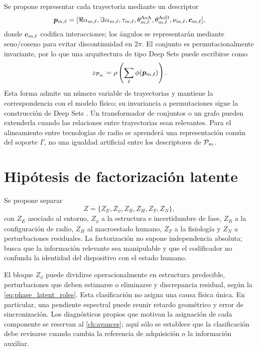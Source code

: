 Se propone representar cada trayectoria mediante un descriptor
\begin{equation}
\bm{p}_{m,\ell}=
[\Re\alpha_{m,\ell},\Im\alpha_{m,\ell},\tau_{m,\ell},
\theta^{\rm AoA}_{m,\ell},\theta^{\rm AoD}_{m,\ell},
\nu_{m,\ell},\bm{c}_{m,\ell}],
\end{equation}
donde $\bm{c}_{m,\ell}$ codifica interacciones; los ángulos se representarán mediante seno/coseno para evitar discontinuidad en $2\pi$. El conjunto es permutacionalmente invariante, por lo que una arquitectura de tipo Deep Sets puede escribirse como
\begin{equation}
z_{\mathcal{P}_m}=\rho\left(\sum_{\ell}\phi(\bm{p}_{m,\ell})\right).
\label{eq:deepset_paths}
\end{equation}
Esta forma admite un número variable de trayectorias y mantiene la correspondencia con el modelo físico; su invariancia a permutaciones sigue la construcción de Deep Sets \citep{Zaheer2017DeepSets}. Un transformador de conjuntos o un grafo pueden extenderla cuando las relaciones entre trayectorias sean relevantes. Para el alineamiento entre tecnologías de radio se aprenderá una representación común del soporte $\Gamma$, no una igualdad artificial entre los descriptores de $\mathcal{P}_m$.

\section{Hipótesis de factorización latente}

Se propone separar
\begin{equation}
Z=\{Z_E,Z_\phi,Z_R,Z_H,Z_F,Z_N\},
\label{eq:factor_latent}
\end{equation}
con $Z_E$ asociado al entorno, $Z_\phi$ a la estructura e incertidumbre de fase, $Z_R$ a la configuración de radio, $Z_H$ al macroestado humano, $Z_F$ a la fisiología y $Z_N$ a perturbaciones residuales. La factorización no supone independencia absoluta; busca que la información relevante sea manipulable y que el codificador no confunda la identidad del dispositivo con el estado humano.

El bloque $Z_\phi$ puede dividirse operacionalmente en estructura predecible,
perturbaciones que deben estimarse o eliminarse y discrepancia residual, según la
\cref{eq:phase_latent_roles}. Esta clasificación no asigna una causa física única.
En particular, una pendiente espectral puede reunir retardo geométrico y error de
sincronización. Los diagnósticos propios que motivan la asignación de cada componente
se reservan al \cref{ch:avances}; aquí sólo se establece que la clasificación debe
revisarse cuando cambia la referencia de adquisición o la información auxiliar.

